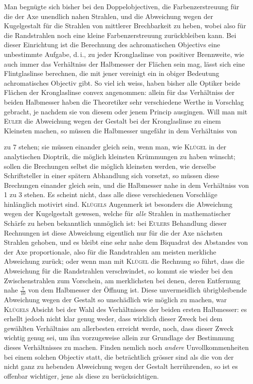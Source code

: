 Man begnügte sich bisher bei den Doppelobjectiven, die Farbenzerstreuung für die der Axe unendlich nahen Strahlen, und die Abweichung wegen der Kugelgestalt für die Strahlen von mittlerer Brechbarkeit zu heben, wobei also für die Randstrahlen noch eine kleine Farbenzerstreuung zurückbleiben kann. Bei dieser Einrichtung ist die Berechnung des achromatischen Objectivs eine unbestimmte Aufgabe, d.\,i., zu jeder Kronglaslinse von positiver Brennweite, wie auch immer das Verhältniss der Halbmesser der Flächen sein mag, lässt sich eine Flintglaslinse berechnen, die mit jener vereinigt ein in obiger Bedeutung achromatisches Objectiv gibt. So viel ich weiss, haben bisher alle Optiker beide Flächen der Kronglaslinse convex angenommen: allein für das Verhältniss der beiden Halbmesser haben die Theoretiker sehr verschiedene Werthe in Vorschlag gebracht, je nachdem sie von diesem oder jenem Princip ausgingen. Will man mit \textsc{Euler} die Abweichung wegen der Gestalt bei der Kronglaslinse zu einem Kleinsten machen, so müssen die Halbmesser ungefähr in dem Verhältniss von
\par\clearpage
{}
 zu 7 stehen; sie müssen einander gleich sein, wenn man, wie \textsc{Klügel} in der analytischen Dioptrik, die möglich kleinsten Krümmungen zu haben wünscht; sollen die Brechungen selbst die möglich kleinsten werden, wie derselbe Schriftsteller in einer spätern Abhandlung sich vorsetzt, so müssen diese Brechungen einander gleich sein, und die Halbmesser nahe in dem Verhältniss von 1 zu 3 stehen. Es scheint nicht, dass alle diese verschiedenen Vorschläge hinlänglich motivirt sind. \textsc{Klügels} Augenmerk ist besonders die Abweichung wegen der Kugelgestalt gewesen, welche für \textit{alle} Strahlen in mathematischer Schärfe zu heben bekanntlich unmöglich ist: bei \textsc{Eulers} Behandlung dieser Rechnungen ist diese Abweichung eigentlich nur für die der Axe nächsten Strahlen gehoben, und es bleibt eine sehr nahe dem Biquadrat des Abstandes von der Axe proportionale, also für die Randstrahlen am meisten merkliche Abweichung zurück; oder wenn man mit \textsc{Klügel} die Rechnung so führt, dass die Abweichung für die Randstrahlen verschwindet, so kommt sie wieder bei den Zwischenstrahlen zum Vorschein, am merklichsten bei denen, deren Entfernung nahe $\tfrac{7}{10}$ von dem Halbmesser der Öffnung ist. Diese unvermeidlich übrigbleibende Abweichung wegen der Gestalt so unschädlich wie möglich zu machen, war \textsc{Klügels} Absicht bei der Wahl des Verhältnisses der beiden ersten Halbmesser: es erhellt jedoch nicht klar genug weder, dass wirklich dieser Zweck bei dem gewählten Verhältniss am allerbesten erreicht werde, noch, dass dieser Zweck wichtig genug sei, um ihn vorzugsweise allein zur Grundlage der Bestimmung dieses Verhältnisses zu machen. Finden nemlich noch \textit{andere} Unvollkommenheiten bei einem solchen Objectiv statt, die beträchtlich grösser sind als die von der nicht ganz zu hebenden Abweichung wegen der Gestalt herrührenden, so ist es offenbar wichtiger, jene als diese zu berücksichtigen.


